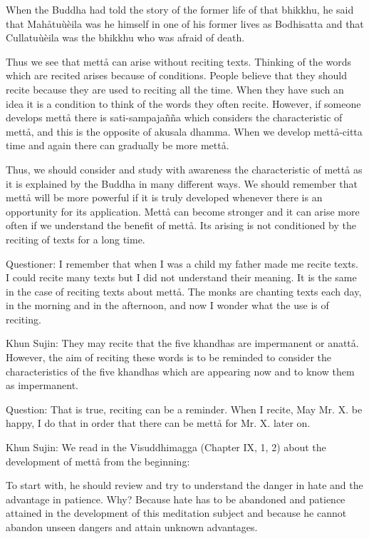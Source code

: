 \documentclass[12pt,twoside]{article}
\begin{document}
When the Buddha had told the story of the former life of that bhikkhu,
he said that Mah{\aa}tu\`u\`eila was he himself in one of his former
lives as Bodhisatta and that Cullatu\`u\`eila was the bhikkhu who was
afraid of death. 

Thus we see that mett{\aa} can arise without reciting texts. Thinking of
the words which are recited arises because of conditions. People
believe that they should recite because they are used to reciting all
the time. When they have such an idea it is a condition to think of the
words they often recite. However, if someone develops mett{\aa} there
is sati{}-sampaja\~n\~na which considers the characteristic of
mett{\aa}, and this is the opposite of akusala dhamma. When we develop
mett{\aa}{}-citta time and again there can gradually be more mett{\aa}.


Thus, we should consider and study with awareness the characteristic of
mett{\aa} as it is explained by the Buddha in many different ways. We
should remember that mett{\aa} will be more powerful if it is truly
developed whenever there is an opportunity for its application.
Mett{\aa} can become stronger and it can arise more often if we
understand the benefit of mett{\aa}. Its arising is not conditioned by
the reciting of texts for a long time. 

Questioner: I remember that when I was a child my father made me recite
texts. I could recite many texts but I did not understand their
meaning. It is the same in the case of reciting texts about mett{\aa}.
The monks are chanting texts each day, in the morning and in the
afternoon, and now I wonder what the use is of reciting. 

Khun Sujin: They may recite that the five khandhas are impermanent or
anatt{\aa}. However, the aim of reciting these words is to be reminded
to consider the characteristics of the five khandhas which are
appearing now and to know them as impermanent. 

Question: That is true, reciting can be a reminder. When I recite,
{\textasciigrave}{\textasciigrave}May Mr. X. be
happy{\textquotesingle}{\textquotesingle}, I do that in order that
there can be mett{\aa} for Mr. X. later on. 

Khun Sujin: We read in the Visuddhimagga (Chapter IX, 1, 2) about the
development of mett{\aa} from the beginning:


\bigskip

To start with, he should review and try to understand the danger in hate
and the advantage in patience. Why? Because hate has to be abandoned
and patience attained in the development of this meditation subject and
because he cannot abandon unseen dangers and attain unknown advantages.
\end{document}

